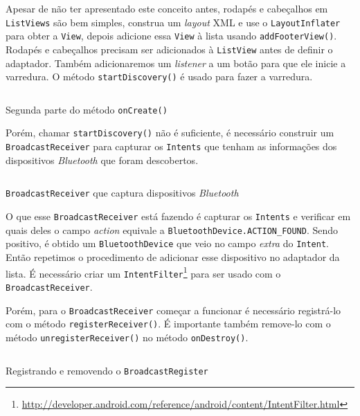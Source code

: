 \documentclass[a4paper,12pt,brazil]{book}
\begin{document}
\begin{singlespace}
	Apesar de não ter apresentado este conceito antes, rodapés e cabeçalhos em \texttt{ListViews} são bem simples, construa um \emph{layout} XML e use o \texttt{LayoutInflater} para obter a \texttt{View}, depois adicione essa \texttt{View} à lista usando \texttt{addFooterView()}. Rodapés e cabeçalhos precisam ser adicionados à \texttt{ListView} antes de definir o adaptador. Também adicionaremos um \emph{listener} a um botão para que ele inicie a varredura. O método \texttt{startDiscovery()} é usado para fazer a varredura.

	\begin{listing}[H]
	\inputminted[linenos=true,fontsize=\small,frame=lines, framesep=2mm, tabsize=2,numbersep=5pt]{java}{src/api/bluetooth/oncreate2.java}
	\caption{Segunda parte do método \texttt{onCreate()}}
	\label{code:bluetooth-oncreate2}
	\end{listing} 			

	Porém, chamar \texttt{startDiscovery()} não é suficiente, é necessário construir um \texttt{BroadcastReceiver} para capturar os \texttt{Intents} que tenham as informações dos dispositivos \emph{Bluetooth} que foram descobertos.

	\begin{listing}[H]
	\inputminted[linenos=true,fontsize=\small,frame=lines, framesep=2mm, tabsize=2,numbersep=5pt]{java}{src/api/bluetooth/broadcast.java}
	\caption{\texttt{BroadcastReceiver} que captura dispositivos \emph{Bluetooth}}
	\label{code:bluetooth-broadcastreceiver}
	\end{listing} 			

	O que esse \texttt{BroadcastReceiver} está fazendo é capturar os \texttt{Intents} e verificar em quais deles o campo \emph{action} equivale a \texttt{BluetoothDevice.ACTION\_FOUND}. Sendo positivo, é obtido um \texttt{BluetoothDevice} que veio no campo \emph{extra} do \texttt{Intent}. Então repetimos o procedimento de adicionar esse dispositivo no adaptador da lista. É necessário criar um \texttt{IntentFilter}\footnote{\href{http://developer.android.com/reference/android/content/IntentFilter.html}{http://developer.android.com/reference/android/content/IntentFilter.html}} para ser usado com o \texttt{BroadcastReceiver}.

	Porém, para o \texttt{BroadcastReceiver} começar a funcionar é necessário registrá-lo com o método \texttt{registerReceiver()}. É importante também remove-lo com o método \texttt{unregisterReceiver()} no método \texttt{onDestroy()}.

	\begin{listing}[H]
	\inputminted[linenos=true,fontsize=\small,frame=lines, framesep=2mm, tabsize=2,numbersep=5pt]{java}{src/api/bluetooth/register.java}
	\caption{Registrando e removendo o \texttt{BroadcastRegister}}
	\label{code:bluetooth-registerbroadcast}
	\end{listing} 			


\end{singlespace}
\end{document}
